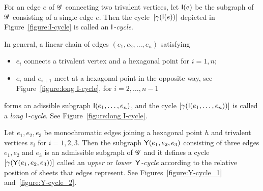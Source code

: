 \begin{example}
For an edge $e$ of $\mathscr{G}$ connecting two trivalent vertices, let $\mathsf{I}(e)$ be the subgraph of $\mathscr{G}$ consisting of a single edge $e$.
Then the cycle~$[\gamma(\mathsf{I}(e))]$ depicted in Figure~\ref{figure:I-cycle} is called an \emph{$\mathsf{I}$-cycle}.

In general, a linear chain of edges $(e_1,e_2,\dots, e_n)$ satisfying
\begin{itemize}
\item $e_i$ connects a trivalent vertex and a hexagonal point for $i=1,n$;
\item $e_i$ and $e_{i+1}$ meet at a hexagonal point in the opposite way, see Figure~\ref{figure:long I-cycle}, for $i=2,\dots, n-1$
\end{itemize}
forms an adissible subgraph $\mathsf{I}(e_1,\dots, e_n)$, and the cycle $[\gamma(\mathsf{I}(e_1,\dots, e_n))]$ is called a \emph{long $\mathsf{I}$-cycle}. See Figure~\ref{figure:long I-cycle}.
\end{example}

\begin{example}
Let $e_1,e_2,e_3$ be monochromatic edges joining a hexagonal point $h$ and trivalent vertices $v_i$ for $i=1,2,3$.
Then the subgraph $\mathsf{Y}(e_1,e_2,e_3)$ consisting of three edges $e_1, e_2$ and $e_3$ is an admissible subgraph of $\mathscr{G}$ and it defines a cycle $[\gamma(\mathsf{Y}(e_1,e_2,e_3))]$ called an \emph{upper} or \emph{lower}~\emph{$\mathsf{Y}$-cycle} according to the relative position of sheets that edges represent.
See Figures~\ref{figure:Y-cycle_1} and~\ref{figure:Y-cycle_2}.
\end{example}

